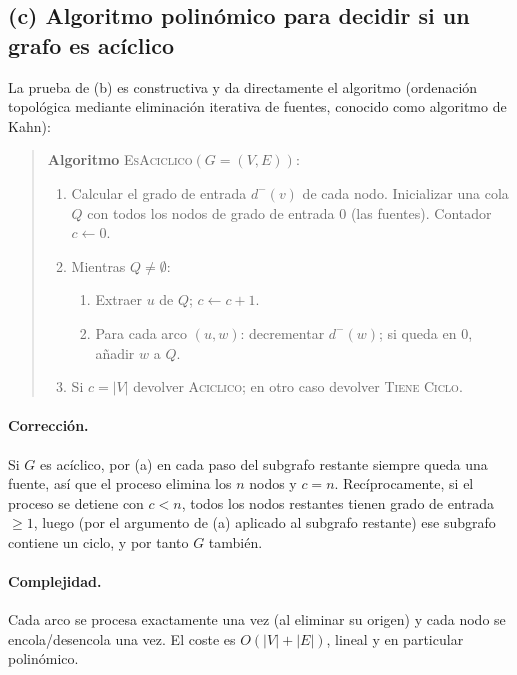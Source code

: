 \documentclass[11pt,a4paper]{article}
\theoremstyle{plain}
\theoremstyle{definition}
\begin{document}
\subsection*{(c) Algoritmo polin\'omico para decidir si un grafo es ac\'iclico}

La prueba de (b) es constructiva y da directamente el algoritmo (ordenaci\'on
topol\'ogica mediante eliminaci\'on iterativa de fuentes, conocido como
algoritmo de Kahn):

\begin{quote}
\textbf{Algoritmo} \textsc{EsAciclico}$(G=(V,E))$:
\begin{enumerate}[nosep]
  \item Calcular el grado de entrada $d^{-}(v)$ de cada nodo. Inicializar una cola
        $Q$ con todos los nodos de grado de entrada $0$ (las fuentes). Contador
        $c\leftarrow 0$.
  \item Mientras $Q\neq\emptyset$:
        \begin{enumerate}[nosep]
          \item Extraer $u$ de $Q$; $c\leftarrow c+1$.
          \item Para cada arco $(u,w)$: decrementar $d^{-}(w)$; si queda en $0$,
                a\~nadir $w$ a $Q$.
        \end{enumerate}
  \item Si $c=|V|$ devolver \textsc{Aciclico}; en otro caso devolver
        \textsc{Tiene Ciclo}.
\end{enumerate}
\end{quote}

\paragraph{Correcci\'on.} Si $G$ es ac\'iclico, por (a) en cada paso del subgrafo
restante siempre queda una fuente, as\'i que el proceso elimina los $n$ nodos y
$c=n$. Rec\'iprocamente, si el proceso se detiene con $c<n$, todos los nodos
restantes tienen grado de entrada $\geq 1$, luego (por el argumento de (a)
aplicado al subgrafo restante) ese subgrafo contiene un ciclo, y por tanto $G$
tambi\'en.

\paragraph{Complejidad.} Cada arco se procesa exactamente una vez (al eliminar su
origen) y cada nodo se encola/desencola una vez. El coste es
$O(|V|+|E|)$, lineal y en particular polin\'omico.
\end{document}
